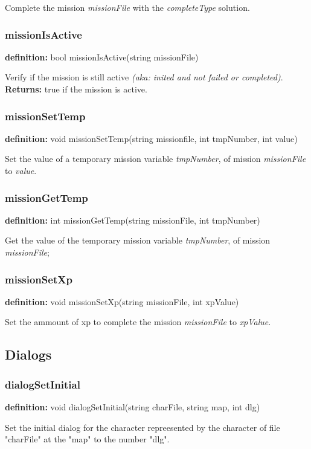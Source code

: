 \documentclass[ letterpaper,12pt]{article}
\begin{document}
Complete the mission {\it missionFile} with the {\it completeType} solution.

\subsubsection{missionIsActive}
{\bf definition:} bool missionIsActive(string missionFile)

Verify if the mission is still active {\it (aka: inited and not failed or
completed)}. {\bf Returns: } true if the mission is active.

\subsubsection{missionSetTemp}
{\bf definition:} void missionSetTemp(string missionfile, int tmpNumber, int value)

Set the value of a temporary mission variable {\it tmpNumber}, of mission {\it
missionFile} to {\it value}.


\subsubsection{missionGetTemp}
{\bf definition:} int missionGetTemp(string missionFile, int tmpNumber)

Get the value of the temporary mission variable {\it tmpNumber}, of mission {\it
missionFile};

\subsubsection{missionSetXp}
{\bf definition:} void missionSetXp(string missionFile, int xpValue)

Set the ammount of xp to complete the mission {\it missionFile} to {\it
xpValue}.

\subsection{Dialogs}

\subsubsection{dialogSetInitial}
{\bf definition:} void dialogSetInitial(string charFile, string map, int dlg)

Set the initial dialog for the character repreesented by the character of file
"charFile" at the "map" to the number "dlg".
\end{document}
